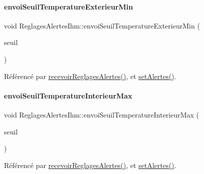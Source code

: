 \paragraph{\texorpdfstring{envoi\+Seuil\+Temperature\+Exterieur\+Min}{envoiSeuilTemperatureExterieurMin}}
{\footnotesize\ttfamily void Reglages\+Alertes\+Ihm\+::envoi\+Seuil\+Temperature\+Exterieur\+Min (\begin{DoxyParamCaption}\item[{Q\+String}]{seuil }\end{DoxyParamCaption})\hspace{0.3cm}{\ttfamily [signal]}}



Référencé par \hyperlink{class_reglages_alertes_ihm_a5c40f718b28b948a90574ef0c2d3e587}{recevoir\+Reglages\+Alertes()}, et \hyperlink{class_reglages_alertes_ihm_aeb0331a6103f944cb15cdd62985ca231}{set\+Alertes()}.

\mbox{\label{class_reglages_alertes_ihm_aa2695b931056a81e6e33ae5e9867b872}} 
\paragraph{\texorpdfstring{envoi\+Seuil\+Temperature\+Interieur\+Max}{envoiSeuilTemperatureInterieurMax}}
{\footnotesize\ttfamily void Reglages\+Alertes\+Ihm\+::envoi\+Seuil\+Temperature\+Interieur\+Max (\begin{DoxyParamCaption}\item[{Q\+String}]{seuil }\end{DoxyParamCaption})\hspace{0.3cm}{\ttfamily [signal]}}



Référencé par \hyperlink{class_reglages_alertes_ihm_a5c40f718b28b948a90574ef0c2d3e587}{recevoir\+Reglages\+Alertes()}, et \hyperlink{class_reglages_alertes_ihm_aeb0331a6103f944cb15cdd62985ca231}{set\+Alertes()}.

\mbox{\label{class_reglages_alertes_ihm_a44b51f5bfba7a28ee82b5e08d042c153}} 
